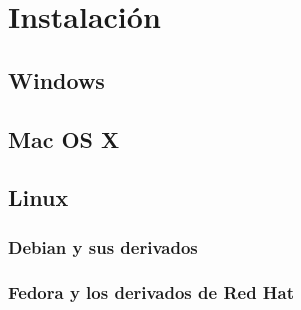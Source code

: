 \section{Instalaci\'on}
\subsection{Windows}
\subsection{Mac OS X}
\subsection{Linux}
\subsubsection{Debian y sus derivados}
\subsubsection{Fedora y los derivados de Red Hat}



